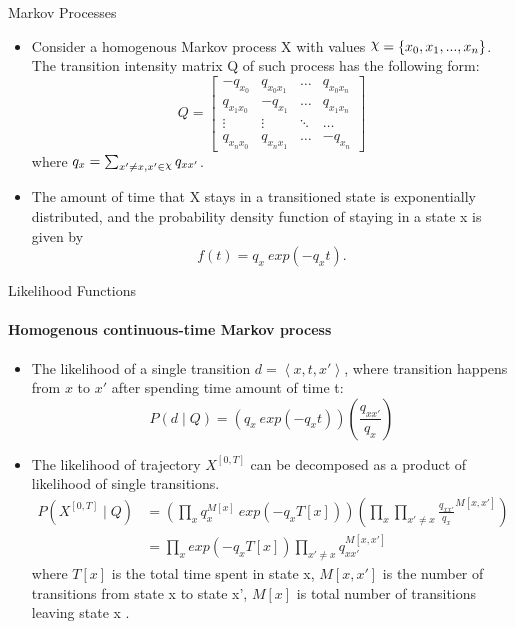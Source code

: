 \documentclass[
english,%
aspectratio=169,%
color={accentcolor=3b},
logo=true,%
colorframetitle=false,%
]{tudabeamer}
\DeclareRobustCommand{\rchi}{{\mathpalette\irchi\relax}}
\newcommand{\irchi}[2]{\raisebox{\depth}{$#1\chi$}}
\begin{document}
\begin{frame}{Markov Processes}
\begin{itemize}
\item Consider a homogenous Markov process X with values $ \rchi = \left\lbrace x_{0}, x_{1},..., x_{n}\right\rbrace  $. The transition intensity matrix Q of such process has the following form:
\begin{equation}
Q = 
\begin{bmatrix}
-q_{x_{0}} & q_{x_{0}x_{1}} & 	{\hdots}  & q_{x_{0}x_{n}} \\
q_{x_{1}x_{0}} & -q_{x_{1}} & 	{\hdots}  & q_{x_{1}x_{n}}  \\
{\vdots}  & 	{\vdots}  & 	{\ddots}  & {\hdots}  \\
q_{x_{n}x_{0}} &  q_{x_{n}x_{1}} &  {\hdots} & -q_{x_{n}}
\end{bmatrix}
\end{equation}
where $ q_{x} = \sum_{x' \neq x, x' \in \rchi} q_{xx'}$.
\item The amount of time that X stays in a transitioned state is exponentially distributed, and the probability density function of staying in a state x is given by \cite{Nodelman1995}
\begin{equation}
f(t) = q_{x}\ exp(-q_{x}t).
\end{equation}
\end{itemize}
\end{frame}


\begin{frame}{Likelihood Functions}
\framesubtitle{Homogenous continuous-time Markov process}
\fontsize{9pt}{6}\selectfont
\begin{itemize}
\item The likelihood of a single transition $ d = \left\langle x,t,x'\right\rangle $, where transition happens from $x$ to $x'$ after spending time amount of time t:
\begin{equation}
P(d  \mid Q) = \left( q_{x}\ exp(-q_{x}t) \right) \left( \frac{q_{xx'}}{q_{x}} \right)
\end{equation}
\item The likelihood of trajectory $X^{[0,T]}$ can be decomposed as a product of likelihood of single transitions.
\begin{align}
P(X^{[0,T]}  \mid Q) & = \left( \prod_{x}  q_{x}^{M[x]}\ exp(-q_{x}T[x]) \right) \left( \prod_{x} \prod_{x' \neq x}  \frac{q_{xx'}}{q_{x}}^{M[x,x']} \right) \nonumber\\ & = \prod_{x}  exp(-q_{x}T[x]) \prod_{x' \neq x}  q_{xx'}^{M[x,x']}
\label{homo_llh}
\end{align}
where $ T[x] $ is the total time spent in state x, $ M[x,x'] $ is the number of transitions from state x to state x', $ M[x] $ is total number of transitions leaving state x \cite{Nodelman2003}.
\end{itemize}
\end{frame}
\end{document}

